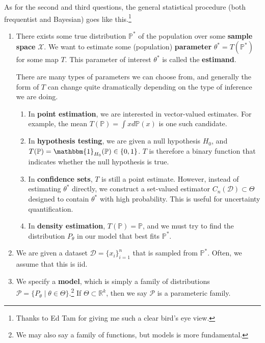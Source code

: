 As for the second and third questions, the general statistical procedure (both frequentist and Bayesian) goes like this.\footnote{Thanks to Ed Tam for giving me such a clear bird's eye view.}
\begin{enumerate}
  \item There exists some true distribution $\mathbb{P}^\ast$ of the population over some \textbf{sample space} $\mathcal{X}$. We want to estimate some (population) \textbf{parameter} $\theta^\ast = T(\mathbb{P}^\ast)$ for some map $T$. This parameter of interest $\theta^\ast$ is called the \textbf{estimand}. 

  There are many types of parameters we can choose from, and generally the form of $T$ can change quite dramatically depending on the type of inference we are doing. 
  \begin{enumerate}
    \item In \textbf{point estimation}, we are interested in vector-valued estimates. For example, the mean $T(\mathbb{P}) = \int x d \mathbb{P}(x)$ is one such candidate. 

    \item In \textbf{hypothesis testing}, we are given a null hypothesis $H_0$, and $T(\mathbb{P}) = \mathbbm{1}_{H_0} (\mathbb{P}) \in \{0, 1\}$. $T$ is therefore a binary function that indicates whether the null hypothesis is true. 

    \item In \textbf{confidence sets}, $T$ is still a point estimate. However, instead of estimating $\theta^\ast$ directly, we construct a set-valued estimator $C_n (\mathcal{D}) \subset \Theta$ designed to contain $\theta^\ast$ with high probability. This is useful for uncertainty quantification. 

    \item In \textbf{density estimation}, $T(\mathbb{P}) = \mathbb{P}$, and we must try to find the distribution $P_\theta$ in our model that best fits $\mathbb{P}^\ast$. 
  \end{enumerate}

  \item We are given a dataset $\mathcal{D} = \{x_i\}_{i=1}^n$ that is sampled from $\mathbb{P}^\ast$. Often, we assume that this is iid. 

  \item We specify a \textbf{model}, which is simply a family of distributions $\mathcal{P} = \{P_{\theta} \mid \theta \in \Theta \}$.\footnote{We may also say a family of functions, but models is more fundamental.} If $\Theta \subset \mathbb{R}^k$, then we say $\mathcal{P}$ is a parameteric family. 


\end{enumerate}
